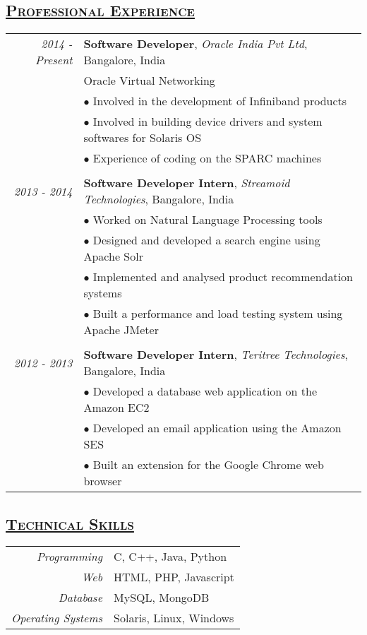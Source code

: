 \documentclass[14pt]{article}
\begin{document}
\subsection* {\scshape\LARGE\uline {Professional Experience}}
\large
\begin{tabularx}{\textwidth}{r X}
\emph{2014 - Present} & \textbf{Software Developer}, \textit{Oracle India Pvt Ltd}, Bangalore, India \\
		                      & Oracle Virtual Networking\\ 
			                & $\bullet$ Involved in the development of Infiniband products\\
			                & $\bullet$ Involved in building device drivers and system softwares for  Solaris OS\\
			                & $\bullet$ Experience of coding on the SPARC machines	    
\\ \\

\emph{2013 - 2014} & \textbf{Software Developer Intern}, \textit{Streamoid Technologies}, Bangalore, India \\ 
			            & $\bullet$ Worked on Natural Language Processing tools \\
		 	            & $\bullet$ Designed and developed a search engine using Apache Solr \\
   			            & $\bullet$ Implemented and analysed product recommendation systems \\
			            & $\bullet$ Built a performance and load testing system using Apache JMeter
\\ \\

\emph{2012 - 2013} & \textbf{Software Developer Intern}, \textit{Teritree Technologies}, Bangalore, India \\ 
			            & $\bullet$ Developed a database web application on the Amazon EC2 \\
			            & $\bullet$ Developed an email application using the Amazon SES\\
			            & $\bullet$ Built an extension for the Google Chrome web browser	    
\end{tabularx}

\subsection* {\scshape\LARGE\uline {Technical Skills}}
\begin{tabular}{r l}
\emph{Programming} & C, C++, Java, Python \\
\emph{Web}              & HTML, PHP, Javascript \\
\emph{Database}	  & MySQL, MongoDB \\
\emph{Operating Systems} & Solaris, Linux, Windows
\end{tabular}
\end{document}
